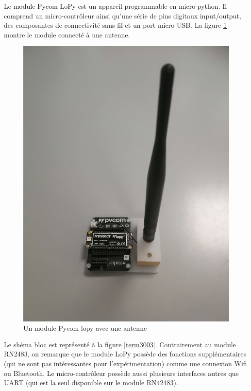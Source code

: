Le module Pycom LoPy \footnotemark[11] est un appareil programmable en micro python. Il comprend un micro-contrôleur ainsi qu'une série de pins digitaux input/output,  des composantes de connectivité sans fil et un port micro \ac{USB}. La figure \ref{term35} montre le module  connecté à une antenne.

\newpage

\begin{figure}[h]
\centering

\includegraphics[scale=0.08]{images/lopy.png}
\caption{Un module Pycom lopy avec une antenne}\label{term35}
\end{figure}


Le shéma bloc \footnotemark[11]  est représenté à la figure \ref{term3003}. Contrairement au module RN2483, on remarque que le module LoPy possède des fonctions supplémentaires 
(qui ne sont pas intéressantes pour l'expérimentation) comme une connexion Wifi ou Bluetooth. Le micro-contrôleur possède aussi plusieurs interfaces autres que UART (qui est la seul disponible sur le module RN42483).


